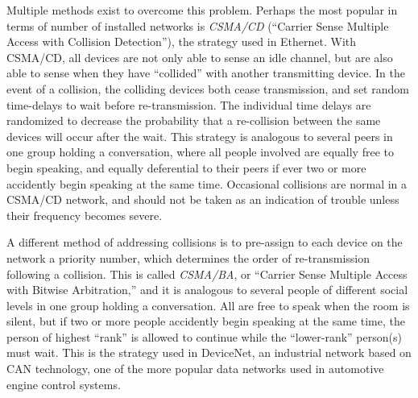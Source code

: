 Multiple methods exist to overcome this problem.  Perhaps the most popular in terms of number of installed networks is \textit{CSMA/CD} (``Carrier Sense Multiple Access with Collision Detection''), the strategy used in Ethernet.  With CSMA/CD, all devices are not only able to sense an idle channel, but are also able to sense when they have ``collided'' with another transmitting device.  In the event of a collision, the colliding devices both cease transmission, and set random time-delays to wait before re-transmission.  The individual time delays are randomized to decrease the probability that a re-collision between the same devices will occur after the wait.  This strategy is analogous to several peers in one group holding a conversation, where all people involved are equally free to begin speaking, and equally deferential to their peers if ever two or more accidently begin speaking at the same time.  Occasional collisions are normal in a CSMA/CD network, and should not be taken as an indication of trouble unless their frequency becomes severe.  

A different method of addressing collisions is to pre-assign to each device on the network a priority number, which determines the order of re-transmission following a collision.  This is called \textit{CSMA/BA}, or ``Carrier Sense Multiple Access with Bitwise Arbitration,'' and it is analogous to several people of different social levels in one group holding a conversation.  All are free to speak when the room is silent, but if two or more people accidently begin speaking at the same time, the person of highest ``rank'' is allowed to continue while the ``lower-rank'' person(s) must wait.  This is the strategy used in DeviceNet, an industrial network based on CAN technology, one of the more popular data networks used in automotive engine control systems.      

